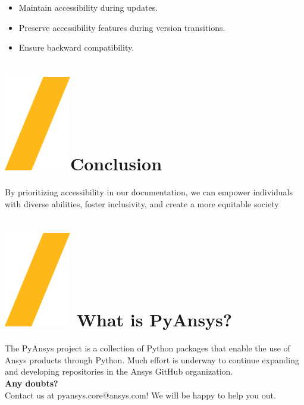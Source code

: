 \documentclass[a0paper,fleqn]{src/betterposter}
\begin{document}
{\begin{itemize}
\item Maintain accessibility during updates.
\item Preserve accessibility features during version transitions.
\item Ensure backward compatibility.
\end{itemize}

\section{\includegraphics[height=\fontcharht\font`\S]{img/general/slash.png}Conclusion}

By prioritizing accessibility in our documentation, we can empower individuals with diverse abilities, 
foster inclusivity, and create a more equitable society

\section{\includegraphics[height=\fontcharht\font`\S]{img/general/slash.png} What is PyAnsys?}
The PyAnsys project is a collection of Python packages that enable the use of Ansys products through Python.
Much effort is underway to continue expanding and developing repositories in the Ansys GitHub organization.
\\
\newline
\textbf{Any doubts?} \\Contact us at pyansys.core@ansys.com! We will be happy to help you out.
\\
\newline

}
\end{document}
